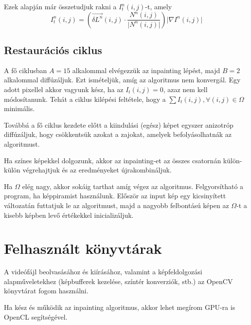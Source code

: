 \documentclass[11pt]{article}
\begin{document}
Ezek alapján már összetudjuk rakni a $ I^n_t(i, j) $-t, amely
\[ I^n_t (i, j) = (\overrightarrow{\delta L^n}(i, j) \cdot \frac{ N^n (i, j) }{ \lvert N^n (i, j) \rvert } ) \lvert \nabla I^n(i,j) \rvert \]

\subsection{Restaurációs ciklus}
A fő ciklusban $A=15$ alkalommal elvégezzük az inpainting lépést, majd $B=2$ alkalommal diffúzáljuk.
Ezt ismételjük, amíg az algoritmus nem konvergál.
Egy adott pixellel akkor vagyunk kész, ha az $I_t(i, j) = 0$, azaz nem kell módosítanunk.
Tehát a ciklus kilépési feltétele, hogy a $\sum I_t(i, j), \forall (i, j) \in \Omega$ minimális.

Továbbá a fő ciklus kezdete előtt a kiindulási (egész) képet egyszer anizotróp diffúzáljuk,
hogy csökkentsük azokat a zajokat, amelyek befolyásolhatnák az algoritmust. 

Ha színes képekkel dolgozunk, akkor az inpainting-et az összes csatornán külön-külön végrehajtjuk
és az eredményeket újrakombináljuk.

Ha $\Omega$ elég nagy, akkor sokáig tarthat amíg végez az algoritmus.
Felgyorsítható a program, ha képpiramist használunk.
Először az input kép egy kicsinyített változatán futtatjuk le az algoritmust,
majd a nagyobb felbontású képen az $\Omega$-t a kisebb képben levő értékekkel inicializáljuk.

\section{Felhasznált könyvtárak}
A videófájl beolvasásához és kiírásához,
valamint a képfeldolgozási alapműveletekhez (képbufferek kezelése, színtér konverziók, stb.)
az OpenCV könyvtárat fogom használni.

Ha kész és működik az inpainting algoritmus, akkor lehet megírom GPU-ra is OpenCL segítségével.

\printbibliography
\end{document}
